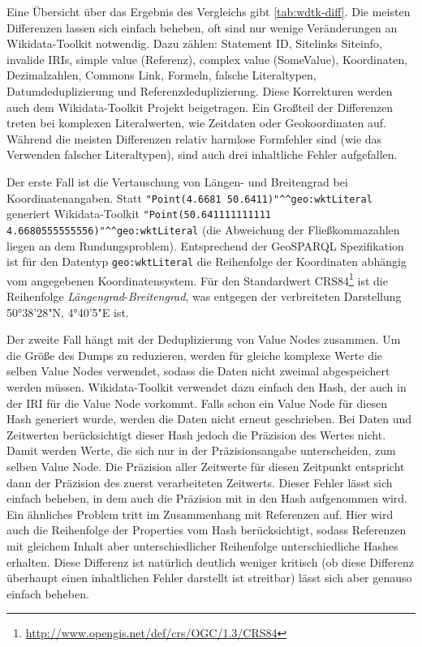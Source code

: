Eine Übersicht über das Ergebnis des Vergleichs gibt \cref{tab:wdtk-diff}.
Die meisten Differenzen lassen sich einfach beheben, oft sind nur wenige Veränderungen an Wikidata-Toolkit notwendig. Dazu zählen: Statement ID, Sitelinks Siteinfo, invalide IRIs, simple value (Referenz), complex value (SomeValue), Koordinaten, Dezimalzahlen, Commons Link, Formeln, falsche Literaltypen, Datumdeduplizierung und Referenzdeduplizierung.
Diese Korrekturen werden auch dem Wikidata-Toolkit Projekt beigetragen.
Ein Großteil der Differenzen treten bei komplexen Literalwerten, wie Zeitdaten oder Geokoordinaten auf.
Während die meisten Differenzen relativ harmlose Formfehler sind (wie das Verwenden falscher Literaltypen), sind auch drei inhaltliche Fehler aufgefallen.

Der erste Fall ist die Vertauschung von Längen- und Breitengrad bei Koordinatenangaben.
Statt \verb|"Point(4.6681 50.6411)"^^geo:wktLiteral| generiert Wikidata-Toolkit \verb|"Point(50.641111111111 4.6680555555556)"^^geo:wktLiteral| (die Abweichung der Fließkommazahlen liegen an dem Rundungsproblem). Entsprechend der GeoSPARQL Spezifikation\cite{spec:geosparql} ist für den Datentyp \verb|geo:wktLiteral| die Reihenfolge der Koordinaten abhängig vom angegebenen Koordinatensystem.
Für den Standardwert CRS84\footnote{\url{http://www.opengis.net/def/crs/OGC/1.3/CRS84}} ist die Reihenfolge \emph{Längengrad}-\emph{Breitengrad}, was entgegen der verbreiteten Darstellung 50°38'28"N, 4°40'5"E ist.

Der zweite Fall hängt mit der Deduplizierung von Value Nodes zusammen.
Um die Größe des Dumps zu reduzieren, werden für gleiche komplexe Werte die selben Value Nodes verwendet, sodass die Daten nicht zweimal abgespeichert werden müssen.
Wikidata-Toolkit verwendet dazu einfach den Hash, der auch in der IRI für die Value Node vorkommt.
Falls schon ein Value Node für diesen Hash generiert wurde, werden die Daten nicht erneut geschrieben.
Bei Daten und Zeitwerten berücksichtigt dieser Hash jedoch die Präzision des Wertes nicht.
Damit werden Werte, die sich nur in der Präzisionsangabe unterscheiden, zum selben Value Node.
Die Präzision aller Zeitwerte für diesen Zeitpunkt entspricht dann der Präzision des zuerst verarbeiteten Zeitwerts.
Dieser Fehler lässt sich einfach beheben, in dem auch die Präzision mit in den Hash aufgenommen wird.
Ein ähnliches Problem tritt im Zusammenhang mit Referenzen auf.
Hier wird auch die Reihenfolge der Properties vom Hash berücksichtigt, sodass Referenzen mit gleichem Inhalt aber unterschiedlicher Reihenfolge unterschiedliche Hashes erhalten.
Diese Differenz ist natürlich deutlich weniger kritisch (ob diese Differenz überhaupt einen inhaltlichen Fehler darstellt ist streitbar) lässt sich aber genauso einfach beheben.

